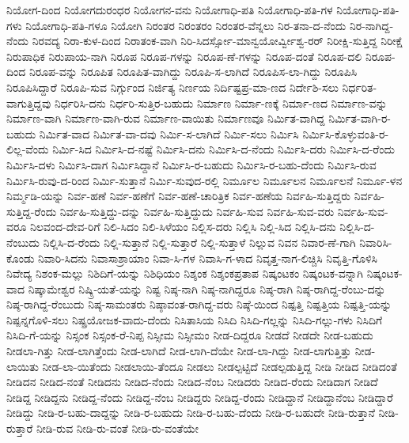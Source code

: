 {ನಿಯೋಗ-ದಿಂದ
ನಿಯೋಗದುರಂಧರ
ನಿಯೋಗನ-ವನು
ನಿಯೋಗಾಧಿ-ಪತಿ
ನಿಯೋಗಾಧಿ-ಪತಿ-ಗಳ
ನಿಯೋಗಾಧಿ-ಪತಿ-ಗಳು
ನಿಯೋಗಾಧಿ-ಪತಿ-ಗಳೂ
ನಿಯೋಗಿ
ನಿರಂತರ
ನಿರಂತರಂ
ನಿರಂತರ-ವೆನ್ನಲು
ನಿರ-ತನಾ-ದ-ನೆಂದು
ನಿರ-ನಾಗಿದ್ದ-ನೆಂದು
ನಿರವದ್ಯ
ನಿರಾ-ಕುಳ-ದಿಂದ
ನಿರಾತಂಕ-ವಾಗಿ
ನಿರಿ-ಸಿದರ್ಸ್ಸೋ-ಮಾನ್ವಯೋರ್ವ್ವೀಶ್ವ-ರರ್
ನಿರೀಕ್ಷಿ-ಸುತ್ತಿದ್ದ
ನಿರೀಕ್ಷೆ
ನಿರುಪಾಧಿಕ
ನಿರುಪಾಯ-ನಾಗಿ
ನಿರೂಪ
ನಿರೂಪ-ಗಳನ್ನು
ನಿರೂಪ-ಣೆ-ಗಳನ್ನು
ನಿರೂಪ-ದಂತೆ
ನಿರೂಪ-ದಲಿ
ನಿರೂಪ-ದಿಂದ
ನಿರೂಪ-ವನ್ನು
ನಿರೂಪಿತ
ನಿರೂಪಿತ-ವಾಗಿದ್ದು
ನಿರೂಪಿ-ಸ-ಲಾಗಿದೆ
ನಿರೂಪಿಸ-ಲಾ-ಗಿದ್ದು
ನಿರೂಪಿಸಿ
ನಿರೂಪಿಸಿದ್ದಾರೆ
ನಿರೂಪಿ-ಸುವ
ನಿರ್ಗ್ಗುಂದ
ನಿರ್ಜಿತ್ಯ
ನಿರ್ಣಯ
ನಿರ್ದಿಷ್ಟಪ್ರ-ಮಾ-ಣದ
ನಿರ್ದೇಶಿ-ಸಲು
ನಿರ್ಧರಿತ-ವಾಗುತ್ತಿದ್ದವು
ನಿರ್ಧರಿಸಿ-ದನು
ನಿರ್ಧರಿ-ಸುತ್ತಿರ-ಬಹುದು
ನಿರ್ಮಾಣ
ನಿರ್ಮಾ-ಣಕ್ಕೆ
ನಿರ್ಮಾ-ಣದ
ನಿರ್ಮಾಣ-ವನ್ನು
ನಿರ್ಮಾಣ-ವಾಗಿ
ನಿರ್ಮಾಣ-ವಾಗಿ-ರುವ
ನಿರ್ಮಾಣ-ವಾಯಿತು
ನಿರ್ಮಾಣವೂ
ನಿರ್ಮಿತ-ವಾಗಿದ್ದ
ನಿರ್ಮಿತ-ವಾಗಿ-ರ-ಬಹುದು
ನಿರ್ಮಿತ-ವಾದ
ನಿರ್ಮಿತ-ವಾ-ದವು
ನಿರ್ಮಿ-ಸ-ಲಾಗಿದೆ
ನಿರ್ಮಿ-ಸಲು
ನಿರ್ಮಿಸಿ
ನಿರ್ಮಿಸಿ-ಕೊಳ್ಳುವಂತಿ-ರ-ಲಿಲ್ಲ-ವೆಂದು
ನಿರ್ಮಿ-ಸಿದ
ನಿರ್ಮಿಸಿ-ದ-ನಷ್ಟೆ
ನಿರ್ಮಿಸಿ-ದನು
ನಿರ್ಮಿಸಿ-ದ-ನೆಂದು
ನಿರ್ಮಿಸಿ-ದರು
ನಿರ್ಮಿಸಿ-ದ-ರೆಂದು
ನಿರ್ಮಿಸಿ-ದಳು
ನಿರ್ಮಿಸಿ-ದಾಗ
ನಿರ್ಮಿಸಿದ್ದಾನೆ
ನಿರ್ಮಿಸಿ-ರ-ಬಹುದು
ನಿರ್ಮಿಸಿ-ರ-ಬಹು-ದೆಂದು
ನಿರ್ಮಿಸಿ-ರುವ
ನಿರ್ಮಿಸಿ-ರುವು-ದ-ರಿಂದ
ನಿರ್ಮಿ-ಸುತ್ತಾನೆ
ನಿರ್ಮಿ-ಸುವುದ-ರಲ್ಲಿ
ನಿರ್ಮೂಲ
ನಿರ್ಮೂಲನ
ನಿರ್ಮೂಲನೆ
ನಿರ್ಮೂ-ಳನ
ನಿರ್ಮ್ಮಡಿ-ಯನ್ನು
ನಿರ್ವ-ಹಣೆ
ನಿರ್ವ-ಹಣೆಗೆ
ನಿರ್ವ-ಹಣೆ-ಚಾರಿತ್ರಿಕ
ನಿರ್ವ-ಹಣೆಯ
ನಿರ್ವಹಿ-ಸುತ್ತಿದ್ದರು
ನಿರ್ವಹಿ-ಸುತ್ತಿದ್ದ-ರೆಂದು
ನಿರ್ವಹಿ-ಸುತ್ತಿದ್ದು-ದನ್ನು
ನಿರ್ವಹಿ-ಸುತ್ತಿದ್ದುದು
ನಿರ್ವಹಿ-ಸುವ
ನಿರ್ವಹಿ-ಸುವ-ವರು
ನಿರ್ವಹಿ-ಸುವ-ವರೂ
ನಿಲವಂದ-ದೇವ-ರಿಗೆ
ನಿಲಿ-ಸಿದಂ
ನಿಲಿ-ಸಿಳೆಯಂ
ನಿಲ್ಲಿಸ-ದರು
ನಿಲ್ಲಿಸಿ
ನಿಲ್ಲಿ-ಸಿದ
ನಿಲ್ಲಿಸಿ-ದನು
ನಿಲ್ಲಿಸಿ-ದ-ನೆಂಬುದು
ನಿಲ್ಲಿಸಿ-ದ-ರೆಂದು
ನಿಲ್ಲಿ-ಸುತ್ತಾನೆ
ನಿಲ್ಲಿ-ಸುತ್ತಾರೆ
ನಿಲ್ಲಿ-ಸುತ್ತಾಳೆ
ನಿಲ್ಲುವ
ನಿವನ
ನಿವಾರ-ಣೆ-ಗಾಗಿ
ನಿವಾರಿಸಿ-ಕೊಂಡು
ನಿವಾರಿ-ಸಿದನು
ನಿವಾಸಾಶ್ರಾಯಾಂ
ನಿವಾ-ಸಿ-ಗಳ
ನಿವಾಸಿ-ಗ-ಳಾದ
ನಿವೃತ್ತ-ನಾಗ-ಲಿಚ್ಚಿಸಿ
ನಿವೃತ್ತಿ-ಗೊಳಿಸಿ
ನಿವೇದ್ಯ
ನಿಶಂಕ-ಮಲ್ಲು
ನಿಶಿದಿಗೆ-ಯನ್ನು
ನಿಶಿಧಿಯಂ
ನಿಶ್ಶಂಕ
ನಿಶ್ಶಂಕಪ್ರತಾಪ
ನಿಷ್ಕಂಟಕಂ
ನಿಷ್ಕಂಟಕ-ವನ್ನಾಗಿ
ನಿಷ್ಕಂಟಕ-ವಾದ
ನಿಷ್ಕಾಮೇಶ್ವರ
ನಿಷ್ಕ್ರಿ-ಯತೆ-ಯನ್ನು
ನಿಷ್ಟ
ನಿಷ್ಠ-ನಾಗಿ
ನಿಷ್ಠ-ನಾಗಿದ್ದರೂ
ನಿಷ್ಠ-ರಾಗಿ
ನಿಷ್ಠ-ರಾಗಿದ್ದ-ರೆಂಬು-ದನ್ನು
ನಿಷ್ಠ-ರಾಗಿದ್ದ-ರೆಂಬುದು
ನಿಷ್ಠ-ಸಾಮಂತರು
ನಿಷ್ಠಾವಂತ-ರಾಗಿದ್ದ-ವರು
ನಿಷ್ಠೆ-ಯಿಂದ
ನಿಷ್ಪತ್ತಿ
ನಿಷ್ಪತ್ತಿಯ
ನಿಷ್ಪತ್ತಿ-ಯನ್ನು
ನಿಷ್ಪನ್ನಗೊಳಿ-ಸಲು
ನಿಷ್ಪ್ರಯೋಜಕ-ವಾದು-ದೆಂದು
ನಿಸಿತಾಸಿಯ
ನಿಸಿದಿ
ನಿಸಿದಿ-ಗಲ್ಲನ್ನು
ನಿಸಿದಿ-ಗಲ್ಲು-ಗಳು
ನಿಸಿದಿಗೆ
ನಿಸಿದಿ-ಗೆ-ಯನ್ನು
ನಿಸ್ಸಂಕ
ನಿಸ್ಸಂಕ-ರೆ-ನಿಪ್ಪ
ನಿಸ್ಸೀಮ
ನಿಸ್ಸೀಮಂ
ನೀಡ-ದಿದ್ದರೂ
ನೀಡದೆ
ನೀಡದೇ
ನೀಡ-ಬಹುದು
ನೀಡಲಾ-ಗಿತ್ತು
ನೀಡ-ಲಾಗಿತ್ತೆಂದು
ನೀಡ-ಲಾಗಿದೆ
ನೀಡ-ಲಾಗಿ-ದೆಯೇ
ನೀಡ-ಲಾ-ಗಿದ್ದು
ನೀಡ-ಲಾಗುತ್ತಿತ್ತು
ನೀಡ-ಲಾಯಿತು
ನೀಡ-ಲಾ-ಯಿತೆಂದು
ನೀಡಲಾಯಿ-ತೆಂದೂ
ನೀಡಲು
ನೀಡಲ್ಪಟ್ಟಿದೆ
ನೀಡಲ್ಪಡುತ್ತಿದ್ದ
ನೀಡಿ
ನೀಡಿದ
ನೀಡಿದಂತೆ
ನೀಡಿದನ
ನೀಡಿದ-ನಂತೆ
ನೀಡಿದನು
ನೀಡಿದ-ನೆಂದು
ನೀಡಿದ-ನೆಂಬ
ನೀಡಿದರು
ನೀಡಿದ-ರೆಂದು
ನೀಡಿದಾಗ
ನೀಡಿದೆ
ನೀಡಿದ್ದ
ನೀಡಿದ್ದನು
ನೀಡಿದ್ದ-ನೆಂದು
ನೀಡಿದ್ದ-ನೆಂಬ
ನೀಡಿದ್ದರು
ನೀಡಿದ್ದ-ರೆಂದು
ನೀಡಿದ್ದಾನೆ
ನೀಡಿದ್ದಾನೆಂಬ
ನೀಡಿದ್ದಾರೆ
ನೀಡಿದ್ದು
ನೀಡಿ-ರ-ಬಹು-ದಾದ್ದನ್ನು
ನೀಡಿ-ರ-ಬಹುದು
ನೀಡಿ-ರ-ಬಹು-ದೆಂದು
ನೀಡಿ-ರ-ಬಹುದೇ
ನೀಡಿ-ರುತ್ತಾನೆ
ನೀಡಿ-ರುತ್ತಾರೆ
ನೀಡಿ-ರುವ
ನೀಡಿ-ರು-ವಂತೆ
ನೀಡಿ-ರು-ವಂತೆಯೇ
}
